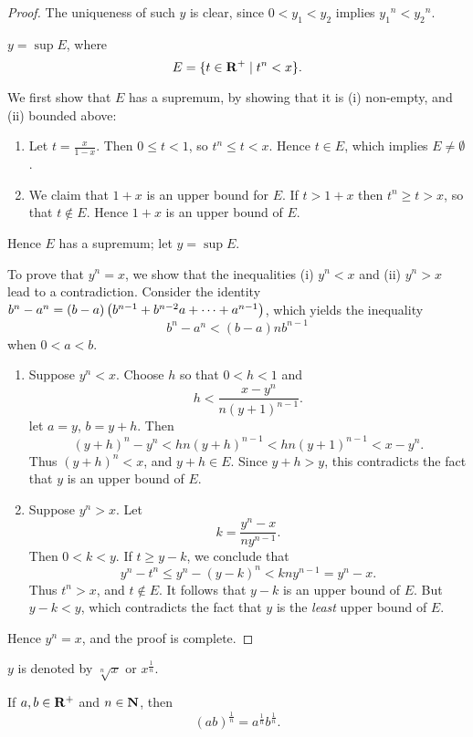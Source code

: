 \begin{proof}
The uniqueness of such $y$ is clear, since $0<y_1<y_2$ implies ${y_1}^n<{y_2}^n$.
\begin{claim}
$y=\sup E$, where
\[E=\{t\in\mathbf R^+\mid t^n<x\}.\]
\end{claim}
We first show that $E$ has a supremum, by showing that it is (i) non-empty, and (ii) bounded above:
\begin{enumerate}[label=(\roman*)]
\item Let $t=\frac{x}{1-x}$. Then $0\le t<1$, so $t^n\le t<x$. Hence $t\in E$, which implies $E\neq\emptyset$.
\item We claim that $1+x$ is an upper bound for $E$. If $t>1+x$ then $t^n\ge t>x$, so that $t\notin E$. Hence $1+x$ is an upper bound of $E$.
\end{enumerate}
Hence $E$ has a supremum; let $y=\sup E$.

To prove that $y^n=x$, we show that the inequalities (i) $y^n<x$ and (ii) $y^n>x$ lead to a contradiction. Consider the identity $b^n-a^n=(b-a)\left(b^{n-1}+b^{n-2}a+\cdots+a^{n-1}\right)$, which yields the inequality
\[b^n-a^n<(b-a)nb^{n-1}\]
when $0<a<b$.
\begin{enumerate}[label=(\roman*)]
\item Suppose $y^n<x$. Choose $h$ so that $0<h<1$ and
\[h<\frac{x-y^n}{n(y+1)^{n-1}}.\]
let $a=y$, $b=y+h$. Then
\[(y+h)^n-y^n<hn(y+h)^{n-1}<hn(y+1)^{n-1}<x-y^n.\]
Thus $(y+h)^n<x$, and $y+h\in E$. Since $y+h>y$, this contradicts the fact that $y$ is an upper bound of $E$.

\item Suppose $y^n>x$. Let
\[k=\frac{y^n-x}{ny^{n-1}}.\]
Then $0<k<y$. If $t\ge y-k$, we conclude that
\[y^n-t^n\le y^n-(y-k)^n<kny^{n-1}=y^n-x.\]
Thus $t^n>x$, and $t\notin E$. It follows that $y-k$ is an upper bound of $E$. But $y-k<y$, which contradicts the fact that $y$ is the \emph{least} upper bound of $E$.
\end{enumerate}

Hence $y^n=x$, and the proof is complete.
\end{proof}

\begin{notation}
$y$ is denoted by $\sqrt[n]{x}$ or $x^\frac{1}{n}$.
\end{notation}

\begin{corollary}
If $a,b\in\mathbf R^+$ and $n\in\mathbf N$, then
\[(ab)^\frac{1}{n}=a^\frac{1}{n}b^\frac{1}{n}.\]
\end{corollary}


